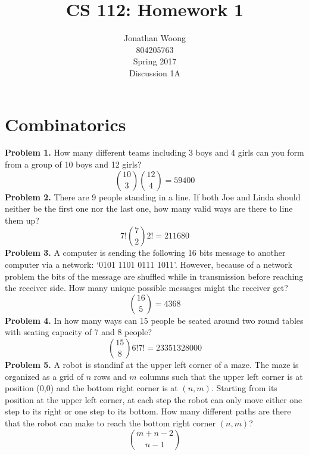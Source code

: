 \documentclass[10.5pt,letterpaper]{article}
\date{\displaydate{date}}
\begin{document}
\title{CS 112: Homework 1}
\author{
	Jonathan Woong\\
	804205763\\
	Spring 2017\\
	Discussion 1A}
\maketitle
\pagebreak


\section{Combinatorics}
\textbf{Problem 1.} How many different teams including 3 boys and 4 girls can you form from a group of 10 boys and 12 girls?
\[{{10}\choose{3}}{{12}\choose{4}} = 59400\]
\textbf{Problem 2.} There are 9 people standing in a line. If both Joe and Linda should neither be the first one nor the last one, how many valid ways are there to line them up?
\[7!{{7}\choose{2}}2!=211680\]
\textbf{Problem 3.} A computer is sending the following 16 bits message to another computer via a network: `0101 1101 0111 1011'. However, because of a network problem the bits of the message are shuffled while in transmission before reaching the receiver side. How many unique possible messages might the receiver get?
\[{{16}\choose{5}} = 4368\]
\textbf{Problem 4.} In how many ways can 15 people be seated around two round tables with seating capacity of 7 and 8 people?
\[{{15}\choose{8}}6!7! = 23351328000\]
\textbf{Problem 5.} A robot is standinf at the upper left corner of a maze. The maze is organized as a grid of $n$ rows and $m$ columns such that the upper left corner is at position (0,0) and the bottom right corner is at $(n,m)$. Starting from its position at the upper left corner, at each step the robot can only move either one step to its right or one step to its bottom. How many different paths are there that the robot can make to reach the bottom right corner $(n,m)$?
\[{{m+n-2}\choose{n-1}}\]
\pagebreak

\end{document}
